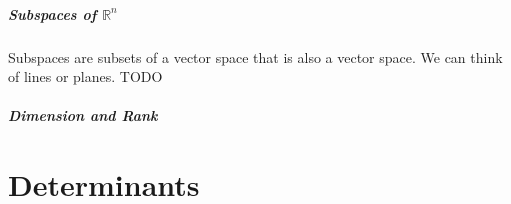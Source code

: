 \documentclass{article}
\begin{document}
\begin{theorem}[LU Factorization]
\end{theorem}

\subsubsection{Subspaces of $\mathbb{R}^n$}

Subspaces are subsets of a vector space that is also a vector space. We can think
of lines or planes. TODO

\begin{definition}[Subspace]
\end{definition}

\begin{definition}
\end{definition}

\begin{definition}
\end{definition}

\begin{theorem}[Basis]
\end{theorem}

\subsubsection{Dimension and Rank}

\begin{definition}
\end{definition}

\begin{definition}[Dimension]
\end{definition}

\begin{definition}[Rank]
\end{definition}

\begin{theorem}
\end{theorem}

\begin{theorem}
\end{theorem}

\begin{theorem}
\end{theorem}

\part{Determinants}
\end{document}
